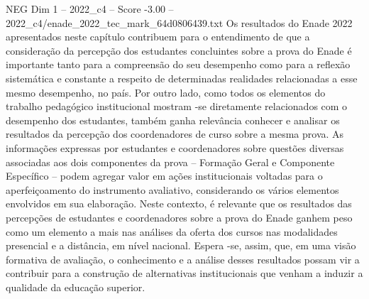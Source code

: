 \begin{textsample}{NEG Dim 1 – 2022\_c4 – Score -3.00 – 2022\_c4/enade\_2022\_tec\_mark\_64d0806439.txt}
Os resultados do Enade 2022 apresentados neste capítulo contribuem para o entendimento de que a consideração da percepção dos estudantes concluintes sobre a prova do Enade é importante tanto para a compreensão do seu desempenho como para a reflexão sistemática e constante a respeito de determinadas realidades relacionadas a esse mesmo desempenho, no país.
Por outro lado, como todos os elementos do trabalho pedagógico institucional mostram -se diretamente relacionados com o desempenho dos estudantes, também ganha relevância conhecer e analisar os resultados da percepção dos coordenadores de curso sobre a mesma prova.
As informações expressas por estudantes e coordenadores sobre questões diversas associadas aos dois componentes da prova – Formação Geral e Componente Específico – podem agregar valor em ações institucionais voltadas para o aperfeiçoamento do instrumento avaliativo, considerando os vários elementos envolvidos em sua elaboração.
Neste contexto, é relevante que os resultados das percepções de estudantes e coordenadores sobre a prova do Enade ganhem peso como um elemento a mais nas análises da oferta dos cursos nas modalidades presencial e a distância, em nível nacional.
Espera -se, assim, que, em uma visão formativa de avaliação, o conhecimento e a análise desses resultados possam vir a contribuir para a construção de alternativas institucionais que venham a induzir a qualidade da educação superior.

\end{textsample}
